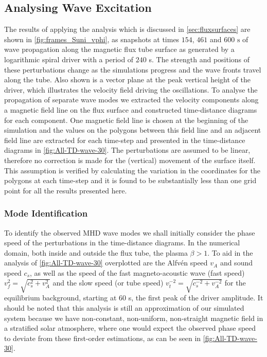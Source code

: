 \subsection{Analysing Wave Excitation}\label{sec:driveranalysis}
The results of applying the analysis which is discussed in \cref{sec:fluxsurfaces} are shown in \cref{fig:frames_Suni_vphi}, as snapshots at times $154$, $461$ and $600 \text{ s}$ of wave propagation along the magnetic flux tube surface as generated by a logarithmic spiral driver with a period of $240$ s.
The strength and positions of these perturbations change as the simulations progress and the wave fronts travel along the tube. 
Also shown is a vector plane at the peak vertical height of the driver, which illustrates the velocity field driving the oscillations.
To analyse the propagation of separate wave modes we extracted the velocity components along a magnetic field line on the flux surface and constructed time-distance diagrams for each component. 
One magnetic field line is chosen at the beginning of the simulation and the values on the polygons between this field line and an adjacent field line are extracted for each time-step and presented in the time-distance diagrams in \cref{fig:All-TD-wave-30}. 
The perturbations are assumed to be linear, therefore no correction is made for the (vertical) movement of the surface itself. 
This assumption is verified by calculating the variation in the coordinates for the polygons at each time-step and it is found to be substantially less than one grid point for all the results presented here.


\subsubsection{Mode Identification}
To identify the observed MHD wave modes we shall initially consider the phase speed of the perturbations in the time-distance diagrams. 
In the numerical domain, both inside and outside the flux tube, the plasma $\beta > 1$.
To aid in the analysis of \cref{fig:All-TD-wave-30} overplotted are the Alfv\'en speed $v_A$ and sound speed $c_s$, as well as the speed of the fast magneto-acoustic wave (fast speed) $v_f^2 = \sqrt{c_s^2 + v_A^2}$ and the slow speed (or tube speed) $v_t^{-2} = \sqrt{c_s^{-2} + v_A^{-2}}$ for the equilibrium background, starting at $60$ s, the first peak of the driver amplitude. 
It should be noted that this analysis is still an approximation of our simulated system because we have non-constant, non-uniform, non-straight magnetic field in a stratified solar atmosphere, where one would expect the observed phase speed to deviate from these first-order estimations, as can be seen in \cref{fig:All-TD-wave-30}.


